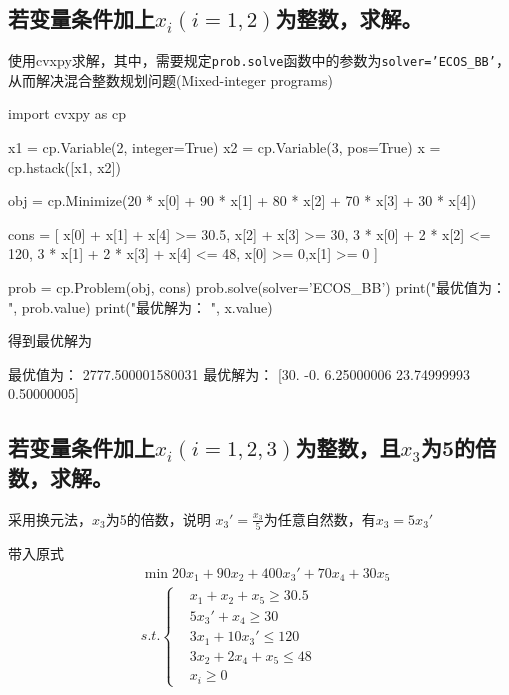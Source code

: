 \subsection{若变量条件加上$x_i(i=1,2)$为整数，求解。}

使用cvxpy求解，其中，需要规定\texttt{prob.solve}函数中的参数为\texttt{solver='ECOS\_BB'}，从而解决混合整数规划问题(Mixed-integer programs)

\begin{python}
    import cvxpy as cp

    x1 = cp.Variable(2, integer=True)
    x2 = cp.Variable(3, pos=True)
    x = cp.hstack([x1, x2])

    obj = cp.Minimize(20 * x[0] + 90 * x[1] + 80 * x[2] + 70 * x[3] + 30 * x[4])

    cons = [
        x[0] + x[1] + x[4] >= 30.5,
        x[2] + x[3] >= 30,
        3 * x[0] + 2 * x[2] <= 120,
        3 * x[1] + 2 * x[3] + x[4] <= 48,
        x[0] >= 0,x[1] >= 0
    ]

    prob = cp.Problem(obj, cons)
    prob.solve(solver='ECOS_BB')
    print("最优值为： ", prob.value)
    print("最优解为： ", x.value)
\end{python}

得到最优解为
\begin{python}
    最优值为：  2777.500001580031
    最优解为：  [30.         -0.          6.25000006 23.74999993  0.50000005]
\end{python}


\subsection{若变量条件加上$x_i(i=1,2,3)$为整数，且$x_3$为5的倍数，求解。}

采用换元法，$x_3$为5的倍数，说明 $x_3' = \frac{x_3}{5}$为任意自然数，有$x_3 = 5x_3'$

带入原式
\begin{equation}
    \begin{aligned}
        & \min 20x_1+90x_2+400x_3'+70x_4+30x_5\\
        & s.t. \left \{
            \begin{aligned}
                & x_1 + x_2 + x_5 \ge 30.5\\
                & 5x_3'+x_4 \ge 30\\
                & 3x_1+10x_3' \le 120\\
                & 3x_2 + 2x_4 +x_5 \le 48\\
                & x_i \ge 0
            \end{aligned}
            \right .
    \end{aligned}
\end{equation}

